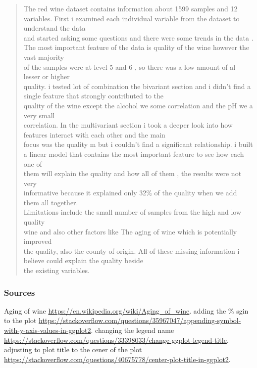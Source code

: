 \documentclass[]{article}
\begin{document}
\begin{quote}
The red wine dataset contains information about 1599 samples and 12
variables. First i examined each individual variable from the dataset to
understand the data\\
and started asking some questions and there were some trends in the data
. The most important feature of the data is quality of the wine however
the vast majority\\
of the samples were at level 5 and 6 , so there was a low amount of al
lesser or higher\\
quality. i tested lot of combination the bivariant section and i didn't
find a single feature that strongly contributed to the\\
quality of the wine except the alcohol we some correlation and the pH we
a very small\\
correlation. In the multivariant section i took a deeper look into how
features interact with each other and the main\\
focus was the quality m but i couldn't find a significant relationship.
i built a linear model that contains the most important feature to see
how each one of\\
them will explain the quality and how all of them , the results were not
very\\
informative because it explained only 32\% of the quality when we add
them all together.\\
Limitations include the small number of samples from the high and low
quality\\
wine and also other factors like The aging of wine which is potentially
improved\\
the quality, also the county of origin. All of these missing information
i believe could explain the quality beside\\
the existing variables.
\end{quote}

\subsubsection{Sources}\label{sources}

Aging of wine \url{https://en.wikipedia.org/wiki/Aging_of_wine}. adding
the \% sgin to the plot
\url{https://stackoverflow.com/questions/35967047/appending-symbol-with-y-axis-values-in-ggplot2}.
changing the legend name
\url{https://stackoverflow.com/questions/33398033/change-ggplot-legend-title}.
adjusting to plot title to the cener of the plot
\url{https://stackoverflow.com/questions/40675778/center-plot-title-in-ggplot2}.
\end{document}
